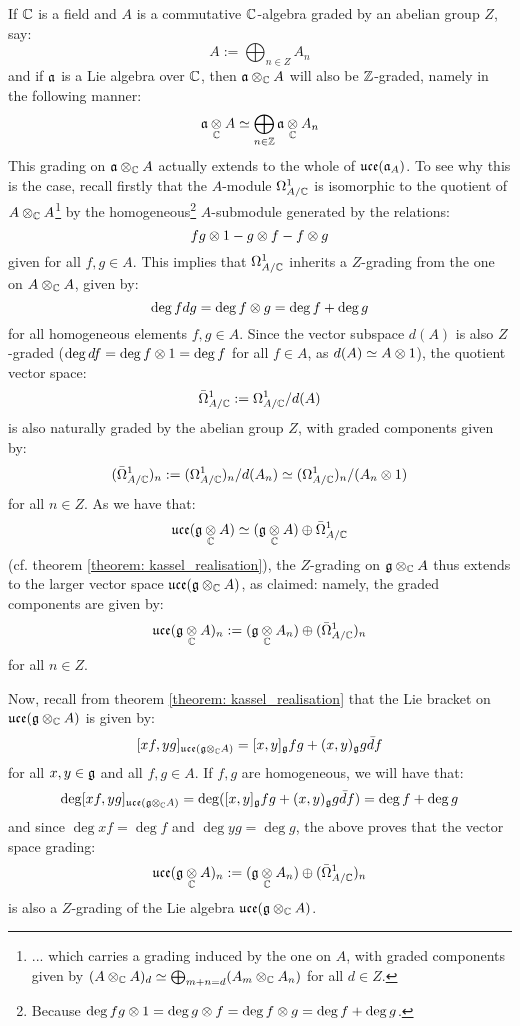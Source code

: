         \begin{remark} \label{remark: Z_gradings_on_toroidal_lie_algebras}
            If $\mathbb{C}$ is a field and $A$ is a commutative $\mathbb{C}$-algebra graded by an abelian group $Z$, say:
                $$A := \bigoplus_{n \in Z} A_n$$
            and if $\mathfrak{a}$ is a Lie algebra over $\mathbb{C}$, then $\a \tensor_{\bbC} A$ will also be $\mathbb{Z}$-graded, namely in the following manner:
                $$\a \tensor_{\bbC} A \cong \bigoplus_{n \in \Z} \a \tensor_{\bbC} A_n$$
            This grading on $\a \tensor_{\bbC} A$ actually extends to the whole of $\mathfrak{uce}(\mathfrak{a}_A)$. To see why this is the case, recall firstly that the $A$-module $\Omega^1_{A/\mathbb{C}}$ is isomorphic to the quotient of $A \tensor_{\bbC} A$\footnote{... which carries a grading induced by the one on $A$, with graded components given by $(A \tensor_{\bbC} A)_d \cong \bigoplus_{m + n = d} (A_m \tensor_{\bbC} A_n)$ for all $d \in Z$.} by the homogeneous\footnote{Because $\deg fg \tensor 1 = \deg g \tensor f = \deg f \tensor g = \deg f + \deg g$.} $A$-submodule generated by the relations:
                $$fg \tensor 1 - g \tensor f - f \tensor g$$
            given for all $f, g \in A$. This implies that $\Omega^1_{A/\mathbb{C}}$ inherits a $Z$-grading from the one on $A \tensor_{\bbC} A$, given by:
                $$\deg f dg = \deg f \tensor g = \deg f + \deg g$$
            for all homogeneous elements $f, g \in A$. Since the vector subspace $d(A)$ is also $Z$-graded ($\deg df = \deg f \tensor 1 = \deg f$ for all $f \in A$, as $d(A) \cong A \tensor 1$), the quotient vector space:
                $$\bar{\Omega}^1_{A/\mathbb{C}} := \Omega^1_{A/\mathbb{C}}/d(A)$$
            is also naturally graded by the abelian group $Z$, with graded components given by:
                $$(\bar{\Omega}^1_{A/\bbC})_n := (\Omega^1_{A/\bbC})_n/d(A_n) \cong (\Omega^1_{A/\bbC})_n/(A_n \tensor 1)$$
            for all $n \in Z$. As we have that:
                $$\uce(\g \tensor_{\bbC} A) \cong (\g \tensor_{\bbC} A) \oplus \bar{\Omega}^1_{A/\bbC}$$
            (cf. theorem \ref{theorem: kassel_realisation}), the $Z$-grading on $\g \tensor_{\bbC} A$ thus extends to the larger vector space $\uce(\g \tensor_{\bbC} A)$, as claimed: namely, the graded components are given by:
                $$\uce(\g \tensor_{\bbC} A)_n := (\g \tensor_{\bbC} A_n) \oplus (\bar{\Omega}^1_{A/\bbC})_n$$
            for all $n \in Z$.

            Now, recall from theorem \ref{theorem: kassel_realisation} that the Lie bracket on $\uce(\g \tensor_{\bbC} A)$ is given by:
                $$[xf, yg]_{\uce(\g \tensor_{\bbC} A)} = [x, y]_{\g} fg + (x, y)_{\g} g \bar{d}f$$
            for all $x, y \in \mathfrak{g}$ and all $f, g \in A$. If $f, g$ are homogeneous, we will have that:
                $$\deg [xf, yg]_{\uce(\g \tensor_{\bbC} A)} = \deg( [x, y]_{\g} fg + (x, y)_{\g} g \bar{d}f ) = \deg f + \deg g$$
            and since $\deg xf = \deg f$ and $\deg yg = \deg g$, the above proves that the vector space grading:
                $$\uce(\g \tensor_{\bbC} A)_n := (\g \tensor_{\bbC} A_n) \oplus (\bar{\Omega}^1_{A/\bbC})_n$$
            is also a $Z$-grading of the Lie algebra $\uce(\g \tensor_{\bbC} A)$.


\end{remark}
